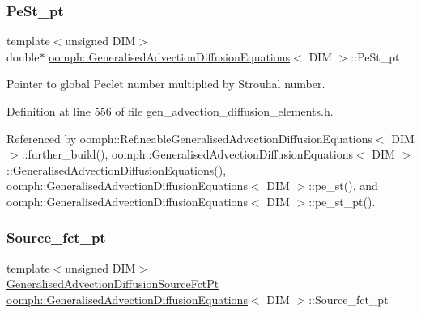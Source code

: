 \subsubsection{\texorpdfstring{Pe\+St\+\_\+pt}{PeSt\_pt}}
{\footnotesize\ttfamily template$<$unsigned D\+IM$>$ \\
double$\ast$ \hyperlink{classoomph_1_1GeneralisedAdvectionDiffusionEquations}{oomph\+::\+Generalised\+Advection\+Diffusion\+Equations}$<$ D\+IM $>$\+::Pe\+St\+\_\+pt\hspace{0.3cm}{\ttfamily [protected]}}



Pointer to global Peclet number multiplied by Strouhal number. 



Definition at line 556 of file gen\+\_\+advection\+\_\+diffusion\+\_\+elements.\+h.



Referenced by oomph\+::\+Refineable\+Generalised\+Advection\+Diffusion\+Equations$<$ D\+I\+M $>$\+::further\+\_\+build(), oomph\+::\+Generalised\+Advection\+Diffusion\+Equations$<$ D\+I\+M $>$\+::\+Generalised\+Advection\+Diffusion\+Equations(), oomph\+::\+Generalised\+Advection\+Diffusion\+Equations$<$ D\+I\+M $>$\+::pe\+\_\+st(), and oomph\+::\+Generalised\+Advection\+Diffusion\+Equations$<$ D\+I\+M $>$\+::pe\+\_\+st\+\_\+pt().

\mbox{\label{classoomph_1_1GeneralisedAdvectionDiffusionEquations_a7ceace6c5f2b7d02e118d0cdd9b69125}} 
\subsubsection{\texorpdfstring{Source\+\_\+fct\+\_\+pt}{Source\_fct\_pt}}
{\footnotesize\ttfamily template$<$unsigned D\+IM$>$ \\
\hyperlink{classoomph_1_1GeneralisedAdvectionDiffusionEquations_ad65d34bc0348f8b297c185d1772eafd9}{Generalised\+Advection\+Diffusion\+Source\+Fct\+Pt} \hyperlink{classoomph_1_1GeneralisedAdvectionDiffusionEquations}{oomph\+::\+Generalised\+Advection\+Diffusion\+Equations}$<$ D\+IM $>$\+::Source\+\_\+fct\+\_\+pt\hspace{0.3cm}{\ttfamily [protected]}}




